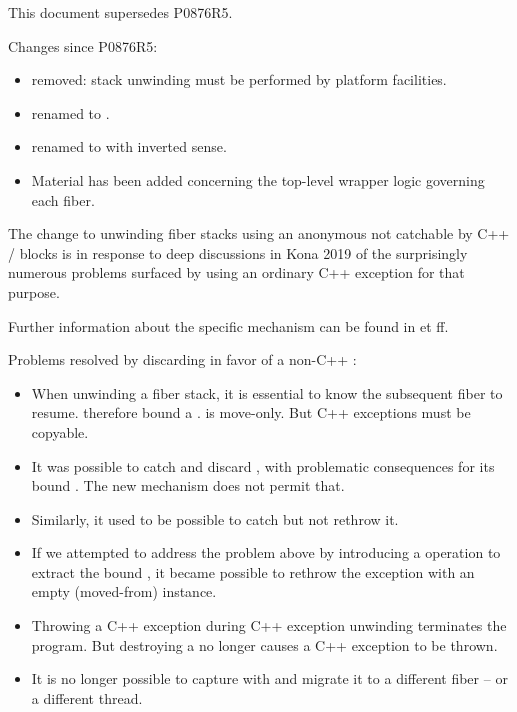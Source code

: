 \label{history}
This document supersedes P0876R5.

Changes since P0876R5:

\begin{itemize}
    \item {} removed: stack unwinding must be
      performed by platform facilities.
    \item {} renamed to
      \canxtresume.
    \item {} renamed to  with inverted
      sense.
    \item Material has been added concerning the top-level wrapper
      logic governing each fiber.
\end{itemize}

The change to unwinding fiber stacks using an anonymous \foreignex not
catchable by C++  /  blocks is in response to deep
discussions in Kona 2019 of the surprisingly numerous problems surfaced by
using an ordinary C++ exception for that purpose.

Further information about the specific mechanism can be found in
 et ff.

Problems resolved by discarding \unwindex in favor of a non-C++ \foreignex:
\begin{itemize}
    \item When unwinding a fiber stack, it is essential to know the subsequent
          fiber to resume. \unwindex therefore bound a \fiber. \fiber is
          move-only. But C++ exceptions must be copyable.
    \item It was possible to catch and discard \unwindex, with problematic
          consequences for its bound \fiber. The new mechanism does not permit
          that.
    \item Similarly, it used to be possible to catch \unwindex but not rethrow it.
    \item If we attempted to address the problem above by introducing a
          \unwindex operation to extract the bound \fiber, it became possible
          to rethrow the exception with an empty (moved-from) \fiber instance.
    \item Throwing a C++ exception during C++ exception unwinding terminates
          the program. But destroying a \fiber no longer causes a C++
          exception to be thrown.
    \item It is no longer possible to capture \unwindex with
           and migrate it to a different fiber -- or
          a different thread.
\end{itemize}

